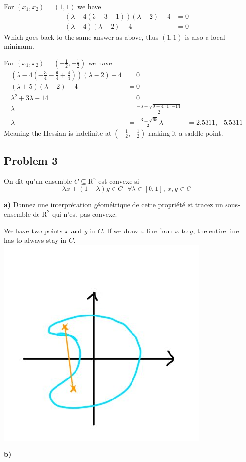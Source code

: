 For $(x_1, x_2) = (1,1)$ we have
\begin{align*}
(\lambda-4(3-3+1))(\lambda -2 ) -4 &= 0 \\
(\lambda -4)(\lambda -2) -4 &= 0
\end{align*}
Which goes back to the same answer as above, thus $(1,1)$ is also a local minimum.

For $(x_1, x_2) = (-\frac{1}{2},-\frac{1}{2})$ we have
\begin{align*}
(\lambda-4(-\frac{3}{4} - \frac{6}{4} + \frac{4}{4}))(\lambda -2 ) -4 &= 0 \\
(\lambda +5)(\lambda -2) -4 &= 0 \\
\lambda^2 + 3 \lambda -14 &= 0 \\
\lambda &= \frac{-3 \pm \sqrt{9-4 \cdot 1 \cdot -14}}{2} \\
\lambda &= \frac{-3 \pm \sqrt{65}}{2}
\lambda &= 2.5311, -5.5311
\end{align*}
Meaning the Hessian is indefinite at $(-\frac{1}{2},-\frac{1}{2})$ making it a saddle point.

\subsection{Problem 3}

On dit qu’un ensemble $C \subseteq \mathrm{R}^n$ est convexe si
\[
	\lambda x+(1-\lambda )y \in C\ \ \ \forall \lambda \in [0,1],\ x, y \in C
\]

\textbf{a)} Donnez une interprétation géométrique de cette propriété et tracez un sous-ensemble de $\mathrm{R}^2$ qui n’est pas convexe.

\answer

We have two points $x$ and $y$ in $C$. If we draw a line from $x$ to $y$, the entire line has to always stay in $C$.
\includegraphics[scale=0.5]{fig/unconstrained_exercices/pb3a.jpg}

\textbf{b)} 














